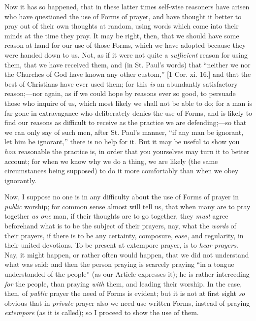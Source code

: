 Now it has so happened, that in these latter times
self-wise reasoners have arisen who have questioned the
use of Forms of prayer, and have thought it better to
pray out of their own thoughts at random, using words
which come into their minds at the time they pray. It may
be right, then, that we should have some reason at hand
for our use of those Forms, which we have adopted because
they were handed down to us. Not, as if it were not quite
a \emph{sufficient} reason for using them, that we have
received them, and (in St. Paul's words) that
``neither we nor the Churches of God have known any other custom,'' [1 Cor. xi. 16.] and that the best of
Christians have ever used them; for this \emph{is} an
abundantly satisfactory reason;—nor again, as if we
could hope by reasons ever so good, to persuade those who
inquire of us, which most likely we shall not be able to
do; for a man is far gone in extravagance who
deliberately denies the use of Forms, and is likely to
find our reasons as difficult to receive as the practice
we are defending;—so that we can only say of such
men, after St. Paul's manner, ``if any man be
ignorant, let him be ignorant,'' there is no help for
it. But it may be useful to show you \emph{how}
reasonable the practice is, in order that you yourselves
may turn it to better account; for when we know why we do
a thing, we are likely (the same circumstances being
supposed) to do it more comfortably than when we obey
ignorantly.

Now, I suppose no one is in any difficulty about the
use of Forms of prayer in \emph{public} worship; for
common sense almost will tell us, that when many are to
pray together \emph{as one} man, if their thoughts are to
go together, they \emph{must} agree beforehand what is to
be the subject of their prayers, nay, what the \emph{words}
of their prayers, if there is to be any certainty,
composure, ease, and regularity, in their united
devotions. To be present at extempore prayer, is to \emph{hear
prayers}. Nay, it might happen, or rather often would
happen, that we did not understand what was said; and
then the person praying is scarcely praying ``in a
tongue understanded of the people'' (as our Article
expresses it); he is rather interceding \emph{for} the
people, than praying \emph{with} them, and leading their
worship. In the case, then, of \emph{public} prayer the
need of Forms is evident; but it is not at first sight \emph{so}
obvious that in \emph{private} prayer also we need use
written Forms, instead of praying \emph{extempore} (as it
is called); so I proceed to show the use of them.

